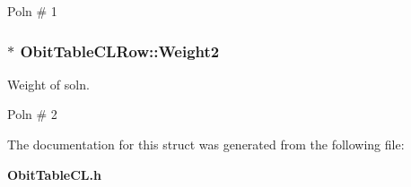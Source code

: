 Poln \# 1 
\subsubsection{$\ast$ {\bf Obit\-Table\-CLRow::Weight2}}\label{structObitTableCLRow_o37}


Weight of soln. 

Poln \# 2 

The documentation for this struct was generated from the following file:\begin{CompactItemize}
\item 
{\bf Obit\-Table\-CL.h}\end{CompactItemize}

